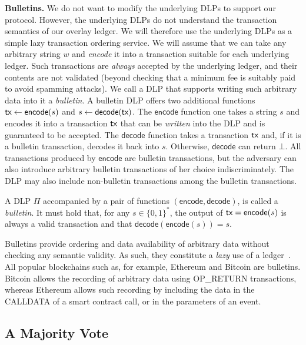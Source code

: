 \textbf{Bulletins.}
We do not want to modify the underlying DLPs to support our protocol. However, the underlying DLPs
do not understand the transaction semantics of our overlay ledger. We will therefore use the underlying
DLPs as a simple lazy transaction ordering service. We will assume that we can take any
arbitrary string $w$ and \emph{encode} it into a transaction suitable for each underlying ledger.
Such transactions are \emph{always} accepted by the underlying ledger, and their contents
are not validated (beyond checking that a minimum fee is suitably paid to avoid spamming attacks).
We call a DLP that supports writing such arbitrary data into it a \emph{bulletin}. A bulletin
DLP offers two additional functions $\textsf{tx} \gets \textsf{encode}(s)$ and $s \gets \textsf{decode}(\textsf{tx})$.
The $\textsf{encode}$ function one takes a string $s$ and encodes it into a transaction $\textsf{tx}$ that can be \emph{written}
into the DLP and is guaranteed to be accepted. The $\textsf{decode}$ function takes a transaction $\textsf{tx}$
and, if it is a bulletin transaction, decodes it back into $s$. Otherwise, $\textsf{decode}$ can return $\bot$.
All transactions produced by $\textsf{encode}$
are bulletin transactions, but the adversary can also introduce arbitrary bulletin transactions of her choice
indiscriminately. The DLP may also include non-bulletin transactions among the bulletin transactions.

\begin{definition}[Bulletin]
  A DLP $\Pi$ accompanied by a pair of functions $(\textsf{encode}, \textsf{decode})$,
  is called a \emph{bulletin}. It must hold that, for any $s \in \{0, 1\}^*$,
  the output of $\textsf{tx} = \textsf{encode}(s)$ is always a valid
  transaction and that $\textsf{decode}(\textsf{encode}(s)) = s$.
\end{definition}

Bulletins provide ordering and data availability of arbitrary data without checking
any semantic validity. As such, they constitute a \emph{lazy} use of a ledger~\cite{lazyledger,lazylight}.
All popular blockchains such as, for example, Ethereum and Bitcoin are bulletins.
Bitcoin allows the recording of arbitrary data using \textsf{OP\_RETURN}
transactions, whereas Ethereum allows such recording by including the
data in the \textsf{CALLDATA} of a smart contract call, or in the parameters
of an event.

\subsection{A Majority Vote}\label{sec:construction-naive}

